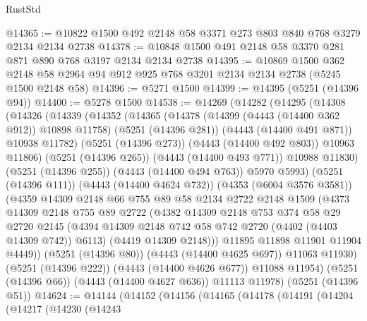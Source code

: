 \begin{lexlean}{RustStd}
\begin{coremodule}
@14365 := @10822 @1500 @492 @2148 @58 @3371 @273 @803 @840 @768 @3279 @2134 @2134 @2738
@14378 := @10848 @1500 @491 @2148 @58 @3370 @281 @871 @890 @768 @3197 @2134 @2134 @2738
@14395 := @10869
    @1500
    @362
    @2148
    @58
    @2964
    @94
    @912
    @925
    @768
    @3201
    @2134
    @2134
    @2738
    (@5245 @1500 @2148 @58)
@14396 := @5271 @1500
@14399 := @14395 (@5251 (@14396 @94))
@14400 := @5278 @1500
@14538 := @14269
    (@14282
      (@14295
        (@14308
          (@14326
            (@14339
              (@14352
                (@14365
                  (@14378
                    (@14399 (@4443 (@14400 @362 @912)) @10898 @11758)
                    (@5251 (@14396 @281))
                    (@4443 (@14400 @491 @871))
                    @10938
                    @11782)
                  (@5251 (@14396 @273))
                  (@4443 (@14400 @492 @803))
                  @10963
                  @11806)
                (@5251 (@14396 @265))
                (@4443 (@14400 @493 @771))
                @10988
                @11830)
              (@5251 (@14396 @255))
              (@4443 (@14400 @494 @763))
              @5970
              @5993)
            (@5251 (@14396 @111))
            (@4443 (@14400 @4624 @732))
            (@4353 (@6004 @3576 @3581))
            (@4359
              @14309
              @2148
              @66
              @755
              @89
              @58
              @2134
              @2722
              @2148
              @1509
              (@4373
                @14309
                @2148
                @755
                @89
                @2722
                (@4382
                  @14309
                  @2148
                  @753
                  @374
                  @58
                  @29
                  @2720
                  @2145
                  (@4394 @14309 @2148 @742 @58 @742 @2720 (@4402 (@4403 @14309 @742)) @6113)
                  (@4419 @14309 @2148)))
              @11895
              @11898
              @11901
              @11904
              @4449))
          (@5251 (@14396 @80))
          (@4443 (@14400 @4625 @697))
          @11063
          @11930)
        (@5251 (@14396 @222))
        (@4443 (@14400 @4626 @677))
        @11088
        @11954)
      (@5251 (@14396 @66))
      (@4443 (@14400 @4627 @636))
      @11113
      @11978)
    (@5251 (@14396 @51))
@14624 := @14144
    (@14152
      (@14156
        (@14165
          (@14178
            (@14191
              (@14204
                (@14217
                  (@14230
                    (@14243

\end{coremodule}
\end{lexlean}

